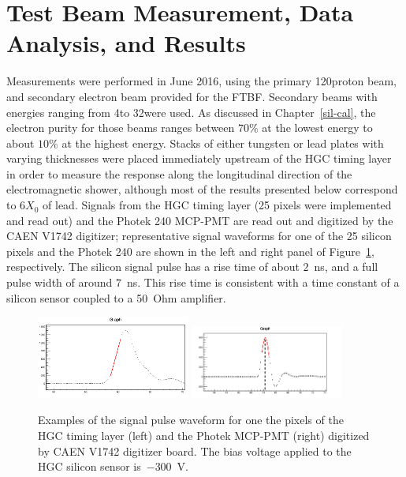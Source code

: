\section{Test Beam Measurement, Data Analysis, and
  Results}\label{hgc:results}
Measurements were performed in June 2016, using the primary 120\GeV proton
beam, and secondary electron
beam provided for the FTBF. Secondary beams with energies ranging from
4\GeV to 32\GeV were used. As discussed in Chapter~\ref{sil-cal}, the electron purity for those beams ranges
between $70\%$ at the lowest energy to about $10\%$ at the highest energy.
Stacks of either tungsten or lead plates with varying thicknesses were placed immediately
upstream of the HGC timing layer in order to measure the response along the
longitudinal direction of the electromagnetic shower, although most of
the results presented below correspond to 6$X_{0}$ of lead. Signals from
the HGC timing layer (25 pixels were implemented and read out) and the Photek 240 MCP-PMT are read out and digitized by the CAEN
V1742 digitizer; representative signal waveforms  for one of the 25
silicon pixels and the Photek 240 are shown in the left and right panel of
Figure~\ref{hgc:pulses}, respectively. The silicon signal pulse has a rise time of
about $2$~ns, and a full pulse width of around $7$~ns. This rise time is
consistent with a time constant of a silicon sensor coupled to a
50~Ohm amplifier.
\begin{figure}[h] 
\centering
\includegraphics[width=0.45\textwidth]{HGC/pixel_linear_fit.png} 
\includegraphics[width=0.45\textwidth]{HGC/photek_gaussian.png} 
\caption{Examples of the signal pulse waveform for one the pixels of
  the HGC timing layer (left) and the Photek MCP-PMT (right) digitized by CAEN V1742 digitizer board. The bias
voltage applied to the HGC silicon sensor is~$-300$~V.} 
\label{hgc:pulses} 
\end{figure} 

